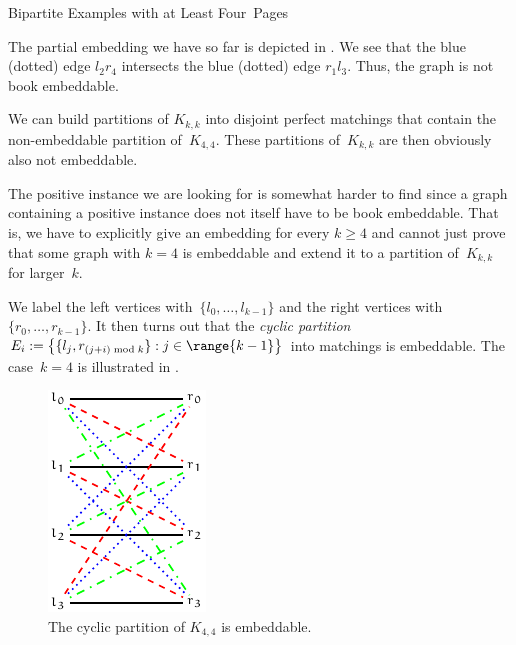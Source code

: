 \begin{subsection}{Bipartite Examples with at Least Four~Pages}
\begin{myproof}
The partial embedding we have so far is depicted in .	
We see that the blue (dotted) edge $l_2r_4$ intersects the blue (dotted) edge $r_1l_3$.
Thus, the graph is not book embeddable.

\end{myproof}

We can build partitions of $K_{k,k}$ into
disjoint perfect matchings that contain the non-embeddable partition of~$K_{4,4}$. These partitions
of~$K_{k,k}$ are then obviously also not embeddable.

The positive instance we are looking for is somewhat harder to find since a graph
containing a positive instance does not itself have to be book embeddable. That is, we have to
explicitly give an embedding for every $k \geq 4$ and cannot just prove that some
graph with $k=4$ is embeddable and extend it to a partition of~$K_{k,k}$ for larger~$k$.

We label the left vertices with~$\{l_0,\dotsc, l_{k-1}\}$ and the right vertices with~$\{r_0,\dotsc, r_{k-1}\}$.
It then turns out that the \emph{cyclic partition} $E_i := \bigl\{\{l_j, r_{(j + i)\mymod{k}}\}: j \in \range{k-1}\bigr\}$ into matchings is embeddable.
The case~$k=4$ is illustrated in . 

\begin{figure}[\placement]\centering
    \includegraphics[scale=2.0]{figures/t_cycle_k4}
    \caption[$K_{4,4}$ has an embeddable partition]{The cyclic partition of $K_{4,4}$ is embeddable.}
    \label{figure:cycle_k4}
\end{figure}


\end{subsection}
